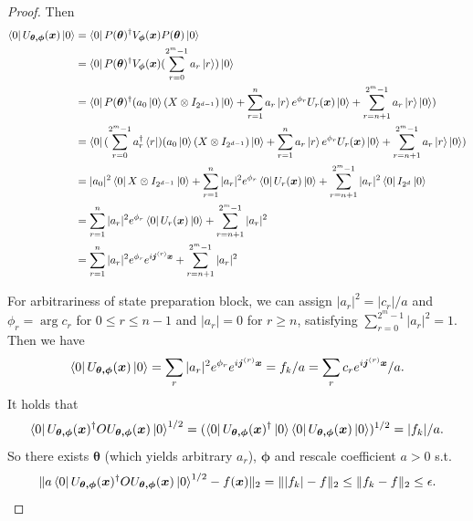 \documentclass{article}
\theoremstyle{plain}
\theoremstyle{definition}
\theoremstyle{remark}
\begin{document}
\begin{proof}
Then
\begin{align*}
    \bra{0}U_{\boldsymbol{\theta,\phi}}(\boldsymbol{x})\ket{0} 
    &= \bra{0}P(\boldsymbol{\theta})^\dagger V_{\boldsymbol{\phi}}(\boldsymbol{x}) P(\boldsymbol{\theta})\ket{0} \\
    &= \bra{0}P(\boldsymbol{\theta})^\dagger V_{\boldsymbol{\phi}}(\boldsymbol{x}) (\sum_{r=0}^{2^m-1} a_r \ket{r})\ket{0} \\
    &= \bra{0}P(\boldsymbol{\theta})^\dagger(a_0\ket{0}(X\otimes I_{2^{d-1}})\ket{0}+\sum_{r=1}^{n} a_r \ket{r}e^{\phi_r}U_r(\boldsymbol{x})\ket{0}+\sum_{r=n+1}^{2^m-1} a_r \ket{r}\ket{0}) \\
    &= \bra{0}(\sum_{r=0}^{2^m-1} a_r^\dagger \bra{r})(a_0\ket{0}(X\otimes I_{2^{d-1}})\ket{0}+\sum_{r=1}^{n} a_r \ket{r}e^{\phi_r}U_r(\boldsymbol{x})\ket{0}+\sum_{r=n+1}^{2^m-1} a_r \ket{r}\ket{0}) \\
    &= |a_0|^2 \bra{0}X\otimes I_{2^{d-1}}\ket{0}
    +
    \sum_{r=1}^{n} |a_r|^2e^{\phi_r} \bra{0}U_r(\boldsymbol{x})\ket{0} 
    +
    \sum_{r=n+1}^{2^m-1} |a_r|^2 \bra{0}I_{2^d}\ket{0} \\
    &= \sum_{r=1}^{n} |a_r|^2e^{\phi_r} \bra{0}U_r(\boldsymbol{x})\ket{0} 
    + \sum_{r=n+1}^{2^m-1} |a_r|^2 \\
    &= \sum_{r=1}^{n} |a_r|^2e^{\phi_r} e^{i\boldsymbol{j}^{(r)} \boldsymbol{x}}
    + \sum_{r=n+1}^{2^m-1} |a_r|^2 
\end{align*}


For arbitrariness of state preparation block, we can assign $|a_r|^2=|c_r|/a$ and $\phi_r = \arg c_r$ for $0\leq r\leq n-1$ and $|a_r|=0$ for $r\geq n$, satisfying $\sum_{r=0}^{2^m-1} |a_r|^2 = 1$. Then we have
$$
\bra{0}U_{\boldsymbol{\theta,\phi}}(\boldsymbol{x})\ket{0} 
= 
\sum_{r} |a_r|^2e^{\phi_r} e^{i\boldsymbol{j}^{(r)} \boldsymbol{x}}
=
f_k/a
=
\sum_{r} c_{r}e^{i\boldsymbol{j}^{(r)}\boldsymbol{x}}/a.
$$
It holds that
$$
\bra{0}
U_{\boldsymbol{\theta,\phi}}(\boldsymbol{x})^\dagger
O
U_{\boldsymbol{\theta,\phi}}(\boldsymbol{x})
\ket{0}^{1/2}
=
(\bra{0}
U_{\boldsymbol{\theta,\phi}}(\boldsymbol{x})^\dagger
\ket{0}
\bra{0}
U_{\boldsymbol{\theta,\phi}}(\boldsymbol{x})
\ket{0})^{1/2}
=
|f_k|/a.
$$
So there exists $\boldsymbol{\theta}$ (which yields arbitrary $a_r$), $\boldsymbol{\phi}$ and rescale coefficient $a>0$ s.t.
$$
\Vert
a\bra{0}
U_{\boldsymbol{\theta,\phi}}(\boldsymbol{x})^\dagger
O
U_{\boldsymbol{\theta,\phi}}(\boldsymbol{x})
\ket{0}^{1/2}
- f(\boldsymbol{x})
\Vert_2
=
\Vert
|f_k| - f
\Vert_2
\leq 
\Vert
f_k - f
\Vert_2
\leq
\epsilon.
$$
\end{proof}
\end{document}
